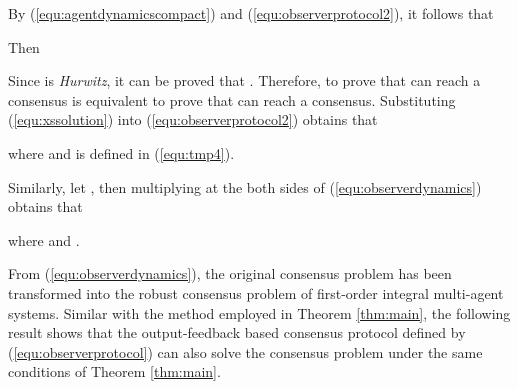 \documentclass[12pt,draftcls,onecolumn]{IEEEtran}
\begin{document}
By (\ref{equ:agentdynamicscompact}) and (\ref{equ:observerprotocol2}), it follows that

Then


Since  is \emph{Hurwitz}, it can be proved that . Therefore, to prove that   can reach a consensus is equivalent to prove that   can reach a consensus. Substituting (\ref{equ:xssolution}) into (\ref{equ:observerprotocol2}) obtains that

where  and  is defined in (\ref{equ:tmp4}).

Similarly, let , then multiplying  at the both sides of (\ref{equ:observerdynamics}) obtains that

where  and .

From (\ref{equ:observerdynamics}), the original consensus problem has been transformed into the robust consensus problem of first-order integral multi-agent systems. Similar with the method employed in Theorem \ref{thm:main}, the following result shows that the output-feedback based consensus protocol defined by (\ref{equ:observerprotocol}) can also solve the consensus problem under the same conditions of Theorem \ref{thm:main}.
\end{document}
